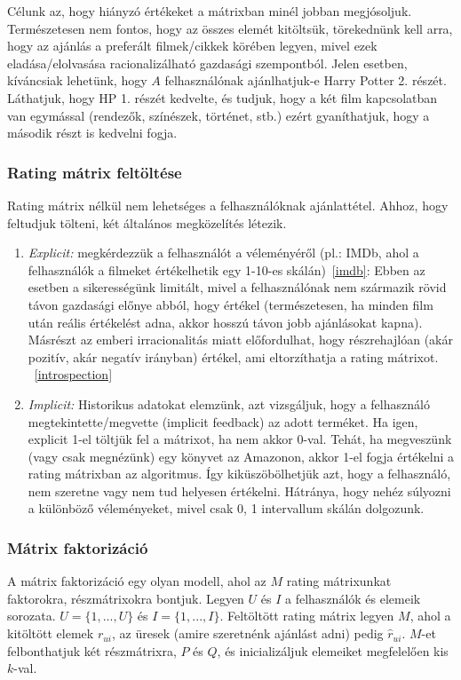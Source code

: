 \documentclass[a4paper,12pt]{article}
\begin{document}
Célunk az, hogy hiányzó értékeket a mátrixban minél jobban megjósoljuk. Természetesen nem fontos, hogy az összes elemét kitöltsük, törekednünk kell arra, hogy az ajánlás a preferált filmek/cikkek körében legyen, mivel ezek eladása/elolvasása racionalizálható gazdasági szempontból. Jelen esetben, kíváncsiak lehetünk, hogy $A$ felhasználónak ajánlhatjuk-e Harry Potter 2. részét. Láthatjuk, hogy HP 1. részét kedvelte, és tudjuk, hogy a két film kapcsolatban van egymással (rendezők, színészek, történet, stb.) ezért gyaníthatjuk, hogy a második részt is kedvelni fogja.


\subsubsection{Rating mátrix feltöltése}
Rating mátrix nélkül nem lehetséges a felhasználóknak ajánlattétel. Ahhoz, hogy feltudjuk tölteni, két általános megközelítés létezik.
\begin{enumerate}
\item \textsl{Explicit:} megkérdezzük a felhasználót a véleményéről (pl.: IMDb, ahol a felhasználók a filmeket értékelhetik egy 1-10-es skálán)~\ref{imdb}: Ebben az esetben a sikerességünk limitált, mivel a felhasználónak nem származik rövid távon gazdasági előnye abból, hogy értékel (természetesen, ha minden film után reális értékelést adna, akkor hosszú távon jobb ajánlásokat kapna). Másrészt az emberi irracionalitás miatt előfordulhat, hogy részrehajlóan (akár pozitív, akár negatív irányban) értékel, ami eltorzíthatja a rating mátrixot. ~\ref{introspection}
\item \textsl{Implicit:} Historikus adatokat elemzünk, azt vizsgáljuk, hogy a felhasználó megtekintette/megvette (implicit feedback) az adott terméket. Ha igen, explicit 1-el töltjük fel a mátrixot, ha nem akkor 0-val. Tehát, ha megveszünk (vagy csak megnézünk) egy könyvet az Amazonon, akkor 1-el fogja értékelni a rating mátrixban az algoritmus. Így kiküszöbölhetjük azt, hogy a felhasználó, nem szeretne vagy nem tud helyesen értékelni. Hátránya, hogy nehéz súlyozni a különböző véleményeket, mivel csak {0, 1} intervallum skálán dolgozunk.
\end{enumerate}

\subsubsection{Mátrix faktorizáció}
A mátrix faktorizáció egy olyan modell, ahol az $M$ rating mátrixunkat faktorokra, részmátrixokra bontjuk. 
Legyen $U$ és $I$ a felhasználók és elemeik sorozata. $U={\{1, ..., U\}}$ és $I={\{1, ..., I\}}$.  Feltöltött rating mátrix legyen $M$, ahol a kitöltött elemek $r_{ui}$, az üresek (amire szeretnénk ajánlást adni) pedig $\hat{r}_{ui}$. $M$-et felbonthatjuk két részmátrixra, $P$ és $Q$, és inicializáljuk elemeiket megfelelően kis $k$-val. 
\end{document}
